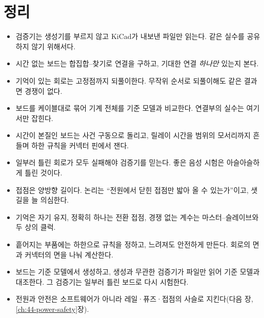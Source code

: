 \section{정리}

\begin{itemize}
\item 검증기는 생성기를 부르지 않고 KiCad가 내보낸 파일만 읽는다. 같은 실수를 공유하지 않기 위해서다.
\item 시간 없는 보드는 합집합--찾기로 연결을 구하고, 기대한 연결 \emph{하나만} 있는지 본다.
\item 기억이 있는 회로는 고정점까지 되풀이한다. 무작위 순서로 되풀이해도 같은 결과면 경쟁이 없다.
\item 보드를 케이블대로 묶어 기계 전체를 기준 모델과 비교한다. 연결부의 실수는 여기서만 잡힌다.
\item 시간이 본질인 보드는 사건 구동으로 돌리고, 릴레이 시간을 범위의 모서리까지 흔들며 하한 규칙을 커넥터 핀에서
잰다.
\item 일부러 틀린 회로가 모두 실패해야 검증기를 믿는다. 좋은 음성 시험은 아슬아슬하게 틀린 것이다.
\end{itemize}

\begin{keybox}[title={5부에서 쓴 방법들}]
\begin{itemize}
\item 접점은 양방향 길이다. 논리는 ``전원에서 닫힌 접점만 밟아 올 수 있는가''이고, 샛길을 늘 의심한다.
\item 기억은 자기 유지, 정확히 하나는 전환 접점, 경쟁 없는 계수는 마스터--슬레이브와 두 상의 클럭.
\item 흩어지는 부품에는 하한으로 규칙을 정하고, 느려져도 안전하게 만든다. 회로의 면과 커넥터의 면을 나눠 계산한다.
\item 보드는 기준 모델에서 생성하고, 생성과 무관한 검증기가 파일만 읽어 기준 모델과 대조한다. 그 검증기는 일부러
틀린 보드로 다시 시험한다.
\item 전원과 안전은 소프트웨어가 아니라 레일·퓨즈·접점의 사슬로 지킨다(다음 장, \ref{ch:44-power-safety}장).
\end{itemize}
\end{keybox}
